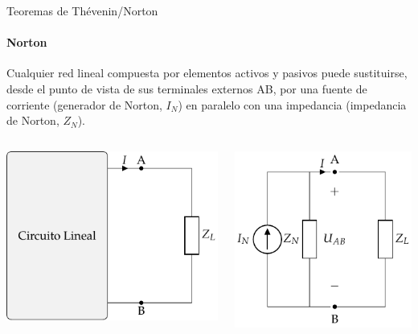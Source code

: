 \documentclass[aspectratio=169, usenames,svgnames,dvipsnames]{beamer}
\begin{document}
\begin{frame}[label={sec:orgf8f9763}]{Teoremas de Thévenin/Norton}
\framesubtitle{Norton}

Cualquier \alert{red lineal} compuesta por elementos activos y pasivos puede sustituirse, desde el punto de vista de sus terminales externos AB, por una \alert{fuente de corriente} (generador de Norton, \(I_N\)) en \alert{paralelo} con una impedancia (impedancia de Norton, \(Z_N\)).

\begin{columns}
\begin{column}{0.5\columnwidth}
\begin{center}
\includegraphics[height=0.6\textheight]{../figs/CircuitoLineal_ZL.pdf}
\end{center}
\end{column}

\begin{column}{0.5\columnwidth}
\begin{center}
\includegraphics[height=0.6\textheight]{../figs/EquivalenteNorton.pdf}
\end{center}
\end{column}
\end{columns}
\end{frame}
\end{document}
